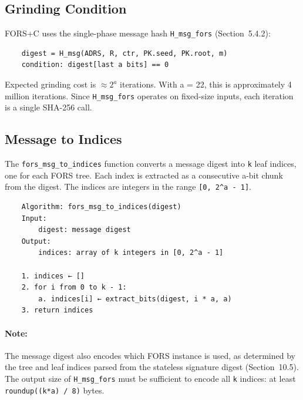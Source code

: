 \subsection{Grinding Condition}
FORS+C uses the single-phase message hash \texttt{H\_msg\_fors} (Section~5.4.2):
\begin{verbatim}
    digest = H_msg(ADRS, R, ctr, PK.seed, PK.root, m)
    condition: digest[last a bits] == 0 
\end{verbatim}

Expected grinding cost is $\approx 2^a$ iterations. With a = 22, this is approximately 4 million iterations. Since \texttt{H\_msg\_fors} operates on fixed-size inputs, each iteration is a single SHA-256 call.

\subsection{Message to Indices}
The \texttt{fors\_msg\_to\_indices} function converts a message digest into \texttt{k} leaf indices, one for each FORS tree. Each index is extracted as a consecutive a-bit chunk from the digest. The indices are integers in the range \texttt{[0, 2\string^a - 1]}.
\begin{verbatim}
    Algorithm: fors_msg_to_indices(digest)
    Input:
        digest: message digest
    Output:
        indices: array of k integers in [0, 2^a - 1]

    1. indices ← []
    2. for i from 0 to k - 1:
        a. indices[i] ← extract_bits(digest, i * a, a)
    3. return indices
\end{verbatim}
\paragraph{Note:} The message digest also encodes which FORS instance is used, as determined by the tree and leaf indices parsed from the stateless signature digest (Section~10.5). The output size of \texttt{H\_msg\_fors} must be sufficient to encode all \texttt{k} indices: at least \texttt{roundup((k*a) / 8)} bytes.

